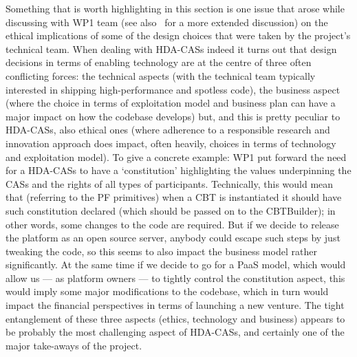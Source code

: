
Something that is worth highlighting in this section is one issue that arose while discussing with WP1 team (see also~\cite{D1.2} for a more extended discussion) on the ethical implications of some of the design choices that were taken by the project's technical team. When dealing with HDA-CASs indeed it turns out that design decisions in terms of enabling technology are at the centre of three often conflicting forces: the technical aspects (with the technical team typically interested in shipping high-performance and spotless code), the business aspect (where the choice in terms of exploitation model and business plan can have a major impact on how the codebase develops) but, and this is pretty peculiar to HDA-CASs, also ethical ones (where adherence to a responsible research and innovation approach does impact, often heavily, choices in terms of technology and exploitation model). To give a concrete example: WP1 put forward the need for a HDA-CASs to have a `constitution' highlighting the values underpinning the CASs and the rights of all types of participants. Technically, this would mean that (referring to the PF primitives) when a CBT is instantiated it should have such constitution declared (which should be passed on to the CBTBuilder); in other words, some changes to the code are required. But if we decide to release the platform as an open source server, anybody could escape such steps by just tweaking the code, so this seems to also impact the business model rather significantly. At the same time if we decide to go for a PaaS model, which would allow us --- as platform owners --- to tightly control the constitution aspect, this would imply some major modifications to the codebase, which in turn would impact the financial perspectives in terms of launching a new venture. The tight entanglement of these three aspects (ethics, technology and business) appears to be probably the most challenging aspect of HDA-CASs, and certainly one of the major take-aways of the project. 


